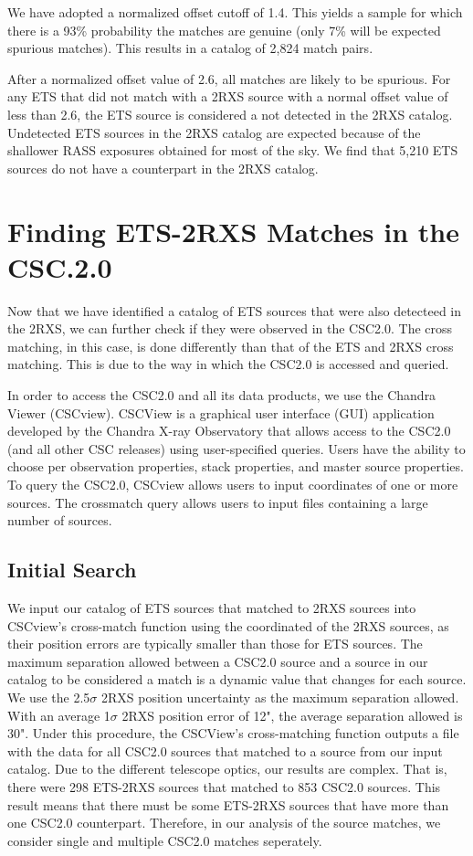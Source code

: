 We have adopted a normalized offset cutoff of 1.4.
This yields a sample for which there is a 93\% probability the matches are genuine (only 7\% will be expected spurious matches). 
This results in a catalog of 2,824 match pairs.

After a normalized offset value of 2.6, all matches are likely to be spurious. 
For any ETS that did not match with a 2RXS source with a normal offset value of less than 2.6, the ETS source is considered a not detected in the 2RXS catalog. 
Undetected ETS sources in the 2RXS catalog are expected because of the shallower RASS exposures obtained for most of the sky.
We find that 5,210 ETS sources do not have a counterpart in the 2RXS catalog.



\section{Finding ETS-2RXS Matches in the CSC.2.0}


Now that we have identified a catalog of ETS sources that were also detecteed in the 2RXS, we can further check if they were observed in the CSC2.0. 
The cross matching, in this case, is done differently than that of the ETS and 2RXS cross matching. 
This is due to the way in which the CSC2.0 is accessed and queried.

In order to access the CSC2.0 and all its data products, we use the Chandra Viewer (CSCview).
CSCView is a graphical user interface (GUI) application developed by the Chandra X-ray Observatory that allows access to the CSC2.0 (and all other CSC releases) using user-specified queries. 
Users have the ability to choose per observation properties, stack properties, and master source properties.
To query the CSC2.0, CSCview allows users to input coordinates of one or more sources.
The crossmatch query allows users to input files containing a large number of sources.


\subsection{Initial Search}

We input our catalog of ETS sources that matched to 2RXS sources into CSCview’s cross-match function using the coordinated of the 2RXS sources, as their position errors are typically smaller than those for ETS sources.
The maximum separation allowed between a CSC2.0 source and a source in our catalog to be considered a match is a dynamic value that changes for each source. 
We use the 2.5$\sigma$ 2RXS position uncertainty as the maximum separation allowed. 
With an average 1$\sigma$ 2RXS position error of 12", the average separation allowed is 30".
Under this procedure, the CSCView's cross-matching function outputs a file with the data for all CSC2.0 sources that matched to a source from our input catalog.
Due to the different telescope optics, our results are complex. 
That is, there were 298 ETS-2RXS sources that matched to 853 CSC2.0 sources. 
This result means that there must be some ETS-2RXS sources that have more than one CSC2.0 counterpart.
Therefore, in our analysis of the source matches, we consider single and multiple CSC2.0 matches seperately.

